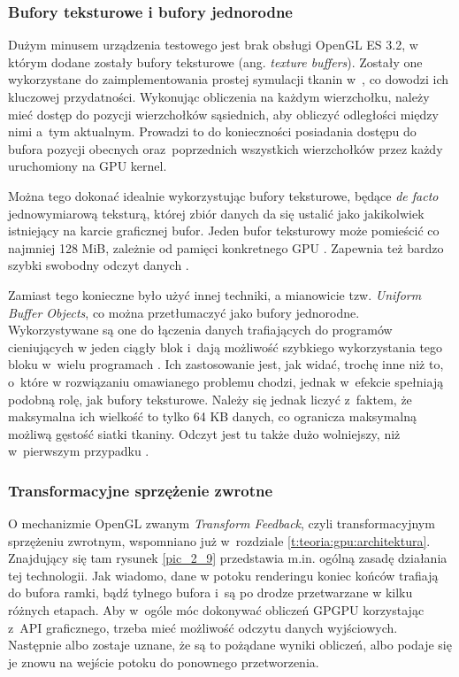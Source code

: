 			\subsubsection{Bufory teksturowe i bufory jednorodne}
			\label{t:technologie:narzedzia:bufory}
			
			Dużym minusem urządzenia testowego jest brak obsługi OpenGL ES 3.2, w którym dodane zostały bufory teksturowe (ang. \emph{texture buffers}). Zostały one wykorzystane do zaimplementowania prostej symulacji tkanin w~\cite{receptury}, co dowodzi ich kluczowej przydatności. Wykonując obliczenia na każdym wierzchołku, należy mieć dostęp do pozycji wierzchołków sąsiednich, aby obliczyć odległości między nimi a~tym aktualnym. Prowadzi to do konieczności posiadania dostępu do bufora pozycji obecnych oraz~poprzednich wszystkich wierzchołków przez każdy uruchomiony na GPU kernel.
			
			Można tego dokonać idealnie wykorzystując bufory teksturowe, będące \emph{de facto} jednowymiarową teksturą, której zbiór danych da się ustalić jako jakikolwiek istniejący na karcie graficznej bufor. Jeden bufor teksturowy może pomieścić co najmniej 128 MiB, zależnie od pamięci konkretnego GPU \cite{opengl_wiki}. Zapewnia też bardzo szybki swobodny odczyt danych \cite{buffers}. 
			
			Zamiast tego konieczne było użyć innej techniki, a mianowicie tzw. \emph{Uniform Buffer Objects}, co można przetłumaczyć jako bufory jednorodne. Wykorzystywane są one do łączenia danych trafiających do programów cieniujących w jeden ciągły blok i~dają możliwość szybkiego wykorzystania tego bloku w~wielu programach \cite{opengl_wiki}. Ich zastosowanie jest, jak widać, trochę inne niż to, o~które w rozwiązaniu omawianego problemu chodzi, jednak w~efekcie spełniają podobną rolę, jak bufory teksturowe. Należy się jednak liczyć z~faktem, że maksymalna ich wielkość to tylko 64 KB danych, co ogranicza maksymalną możliwą gęstość siatki tkaniny. Odczyt jest tu także dużo wolniejszy, niż w~pierwszym przypadku \cite{buffers}.
			
			\subsubsection{Transformacyjne sprzężenie zwrotne}
			\label{t:technologie:narzedzia:transformfeedback}
			
			O mechanizmie OpenGL zwanym \emph{Transform Feedback}, czyli transformacyjnym sprzężeniu zwrotnym, wspomniano już w~rozdziale \ref{t:teoria:gpu:architektura}. Znajdujący się tam rysunek \ref{pic_2_9} przedstawia m.in. ogólną zasadę działania tej technologii. Jak wiadomo, dane w potoku renderingu koniec końców trafiają do bufora ramki, bądź tylnego bufora i~są po drodze przetwarzane w kilku różnych etapach. Aby w~ogóle móc dokonywać obliczeń GPGPU korzystając z~API graficznego, trzeba mieć możliwość odczytu danych wyjściowych. Następnie albo zostaje uznane, że są to pożądane wyniki obliczeń, albo podaje się je znowu na wejście potoku do ponownego przetworzenia. 
			
